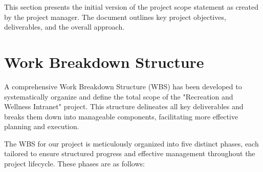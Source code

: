 This section presents the initial version of the project scope statement as created by the project manager. The document outlines key project objectives, deliverables, and the overall approach.



\section{Work Breakdown Structure}

A comprehensive Work Breakdown Structure (WBS) has been developed to systematically organize and define the total scope of the "Recreation and Wellness Intranet" project. This structure delineates all key deliverables and breaks them down into manageable components, facilitating more effective planning and execution.

The WBS for our project is meticulously organized into five distinct phases, each tailored to ensure structured progress and effective management throughout the project lifecycle. These phases are as follows:

